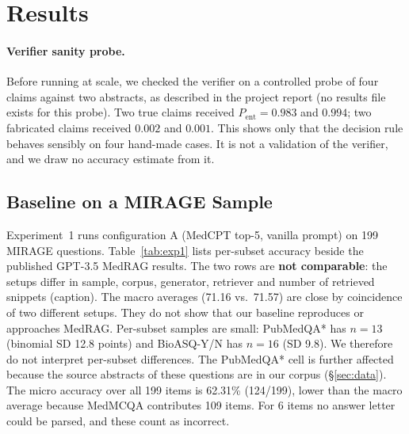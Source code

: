 \documentclass[11pt]{article}
\begin{document}
\section{Results}
\paragraph{Verifier sanity probe.} Before running at scale, we checked the verifier on a controlled probe of four claims against two abstracts, as described in the project report (no results file exists for this probe). Two true claims received $P_{\text{ent}}=0.983$ and $0.994$; two fabricated claims received $0.002$ and $0.001$. %
This shows only that the decision rule behaves sensibly on four hand-made cases. It is not a validation of the verifier, and we draw no accuracy estimate from it.

\subsection{Baseline on a MIRAGE Sample}\label{sec:exp1}
Experiment~1 runs configuration A (MedCPT top-5, vanilla prompt) on 199 MIRAGE questions. Table~\ref{tab:exp1} lists per-subset accuracy beside the published GPT-3.5 MedRAG results. The two rows are \textbf{not comparable}: the setups differ in sample, corpus, generator, retriever and number of retrieved snippets (caption). The macro averages (71.16 vs.\ 71.57) are close by coincidence of two different setups. They do not show that our baseline reproduces or approaches MedRAG. %
Per-subset samples are small: PubMedQA* has $n=13$ (binomial SD 12.8 points) and BioASQ-Y/N has $n=16$ (SD 9.8). We therefore do not interpret per-subset differences. The PubMedQA* cell is further affected because the source abstracts of these questions are in our corpus (\S\ref{sec:data}). The micro accuracy over all 199 items is 62.31\% (124/199), lower than the macro average because MedMCQA contributes 109 items. For 6 items no answer letter could be parsed, and these count as incorrect. %
\end{document}
